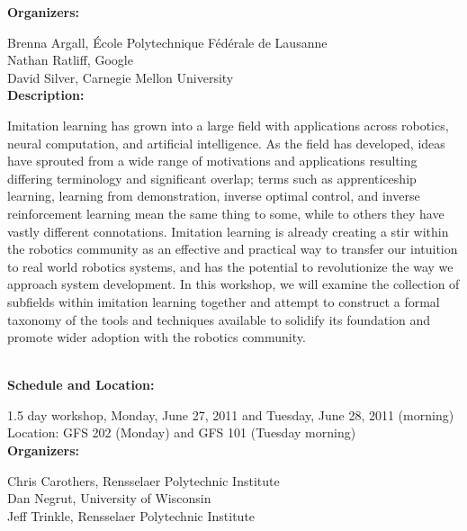 {{\bf  Organizers:}

Brenna Argall, École Polytechnique Fédérale de Lausanne\\
Nathan Ratliff, Google\\
David Silver, Carnegie Mellon University\\[4mm]


{\bf Description: }

Imitation learning has grown into a large field with applications across robotics, neural computation, and artificial intelligence. As the field has developed, ideas have sprouted from a wide range of motivations and applications resulting differing terminology and significant overlap; terms such as apprenticeship learning, learning from demonstration, inverse optimal control, and inverse reinforcement learning mean the same thing to some, while to others they have vastly different connotations. Imitation learning is already creating a stir within the robotics community as an effective and practical way to transfer our intuition to real world robotics systems, and has the potential to revolutionize the way we approach system development. In this workshop, we will examine the collection of subfields within imitation learning together and attempt to construct a formal taxonomy of the tools and techniques available to solidify its foundation and promote wider adoption with the robotics community.



\\[5mm]

{\bf  Schedule and Location:}

1.5 day workshop, Monday, June 27, 2011 and Tuesday, June 28, 2011 (morning)\\
Location: GFS 202 (Monday) and GFS 101 (Tuesday morning) \\[4mm]

{\bf  Organizers:}

Chris Carothers, Rensselaer Polytechnic Institute\\
Dan Negrut, University of Wisconsin\\
Jeff Trinkle,   Rensselaer Polytechnic Institute\\[4mm]

}

